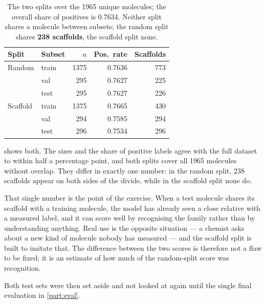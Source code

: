 \begin{table}[htb]
    \centering
    \caption{The two splits over the 1965 unique molecules; the overall share of positives is 0.7634. Neither split shares a molecule between subsets; the random split shares \textbf{238 scaffolds}, the scaffold split none.}
    \label{tab:splits}
    \footnotesize
    \begin{tabular}{@{}llrrr@{}}
        \toprule
        Split & Subset & $n$ & Pos.\ rate & Scaffolds \\
        \midrule
        Random   & train & 1375 & 0.7636 & 773 \\
                 & val   &  295 & 0.7627 & 225 \\
                 & test  &  295 & 0.7627 & 226 \\
        \midrule
        Scaffold & train & 1375 & 0.7665 & 430 \\
                 & val   &  294 & 0.7585 & 294 \\
                 & test  &  296 & 0.7534 & 296 \\
        \bottomrule
    \end{tabular}
\end{table}

 shows both. The sizes and the share of positive labels agree with the full dataset to within half a percentage point, and both splits cover all 1965 molecules without overlap. They differ in exactly one number: in the random split, 238 scaffolds appear on both sides of the divide, while in the scaffold split none do.

That single number is the point of the exercise. When a test molecule shares its scaffold with a training molecule, the model has already seen a close relative with a measured label, and it can score well by recognising the family rather than by understanding anything. Real use is the opposite situation --- a chemist asks about a new kind of molecule nobody has measured --- and the scaffold split is built to imitate that. The difference between the two scores is therefore not a flaw to be fixed; it is an estimate of how much of the random-split score was recognition.

Both test sets were then set aside and not looked at again until the single final evaluation in \ref{part:eval}.
